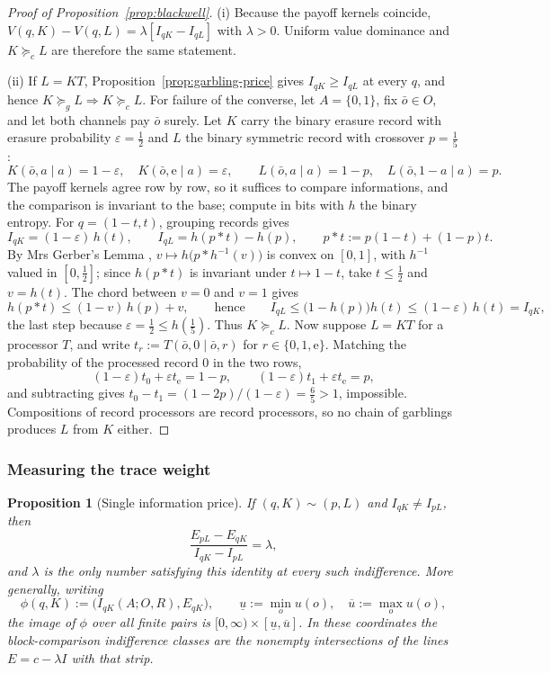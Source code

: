 \documentclass[11pt,a4paper]{article}
\newtheorem{proposition}[theorem]{Proposition}
\theoremstyle{definition}
\newcommand{\I}{I}
\newcommand{\1}{\mathbf 1}
\begin{document}
\begin{proof}[Proof of Proposition~\ref{prop:blackwell}]
(i) Because the payoff kernels coincide,
$V(q,K)-V(q,L)=\lambda[\I_{qK}-\I_{qL}]$ with $\lambda>0$.  Uniform value dominance and
$K\succeq_cL$ are therefore the same statement.

(ii) If $L=KT$, Proposition~\ref{prop:garbling-price} gives $\I_{qK}\ge\I_{qL}$ at every $q$, and hence
$K\succeq_gL\Rightarrow K\succeq_cL$.  For failure of the converse, let $A=\{0,1\}$, fix $\bar o\in O$, and let
both channels pay $\bar o$ surely.  Let $K$ carry the binary
erasure record with erasure probability $\varepsilon=\tfrac12$ and $L$ the binary symmetric record with crossover
$p=\tfrac15$:
\[
 K(\bar o,a\mid a)=1-\varepsilon,\quad K(\bar o,\mathrm e\mid a)=\varepsilon,
 \qquad
 L(\bar o,a\mid a)=1-p,\quad L(\bar o,1-a\mid a)=p.
\]
The payoff kernels agree row by row, so it suffices to compare informations, and the comparison is invariant to the
base; compute in bits with $h$ the binary entropy.  For $q=(1-t,t)$, grouping records gives
\[
 \I_{qK}=(1-\varepsilon)\,h(t),
 \qquad
 \I_{qL}=h(p\ast t)-h(p),
 \qquad p\ast t:=p(1-t)+(1-p)t.
\]
By Mrs Gerber's Lemma \cite{WynerZiv1973}, $v\mapsto h\bigl(p\ast h^{-1}(v)\bigr)$ is convex on $[0,1]$, with
$h^{-1}$ valued in $[0,\tfrac12]$; since $h(p\ast t)$ is invariant under $t\mapsto1-t$, take $t\le\tfrac12$ and
$v=h(t)$.  The chord between $v=0$ and $v=1$ gives
\[
 h(p\ast t)\le(1-v)\,h(p)+v,
 \qquad\text{hence}\qquad
 \I_{qL}\le\bigl(1-h(p)\bigr)h(t)\le(1-\varepsilon)\,h(t)=\I_{qK},
\]
the last step because $\varepsilon=\tfrac12\le h(\tfrac15)$.  Thus $K\succeq_cL$.  Now suppose $L=KT$ for a
processor $T$, and write $t_r:=T(\bar o,0\mid \bar o,r)$ for $r\in\{0,1,\mathrm e\}$.  Matching the probability of the
processed record $0$ in the two rows,
\[
 (1-\varepsilon)t_0+\varepsilon t_{\mathrm e}=1-p,
 \qquad
 (1-\varepsilon)t_1+\varepsilon t_{\mathrm e}=p,
\]
and subtracting gives $t_0-t_1=(1-2p)/(1-\varepsilon)=\tfrac65>1$, impossible.  Compositions of record processors
are record processors, so no chain of garblings produces $L$ from $K$ either.
\end{proof}

\subsubsection{Measuring the trace weight}
\label{app:measurement-proofs}

\begin{proposition}[Single information price]
\label{prop:single-price}\label{lem:info-payoff-plane}
If $(q,K)\sim(p,L)$ and $\I_{qK}\ne\I_{pL}$, then
\[
 \frac{E_{pL}-E_{qK}}{\I_{qK}-\I_{pL}}=\lambda,
\]
and $\lambda$ is the only number satisfying this identity at every such
indifference.  More generally, writing
\[
 \phi(q,K):=\bigl(\I_{qK}(A;O,R),E_{qK}\bigr),\qquad
 \underline u:=\min_o u(o),\quad \overline u:=\max_o u(o),
\]
the image of $\phi$ over all finite pairs is
$[0,\infty)\times[\underline u,\overline u]$.  In these coordinates the
block-comparison indifference classes are the nonempty intersections of the
lines $E=c-\lambda\I$ with that strip.
\end{proposition}
\end{document}
